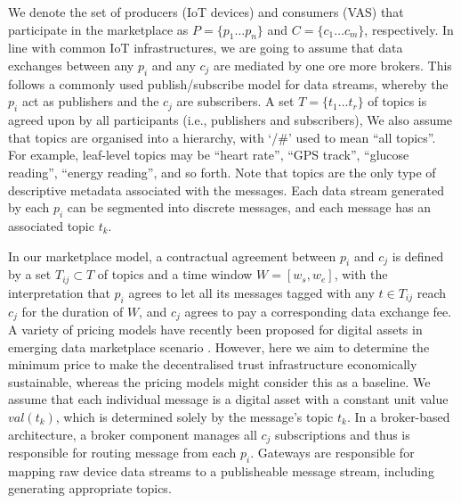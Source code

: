 \documentclass[chi_draft]{sigchi}
\begin{document}
We denote the set of producers (IoT devices) and consumers (VAS) that participate in the marketplace as $P = \{p_1 \dots p_n \}$ and $C = \{ c_1 \dots c_m \}$, respectively.
In line with common %
IoT infrastructures, we are going to assume that data exchanges between any $p_i$ and any $c_j$ are mediated by one ore more brokers. 
This follows a commonly used publish/subscribe model for data streams, whereby the $p_i$ act as publishers and the $c_j$ are subscribers.
A set $T = \{ t_1 \dots t_r \}$ of topics is agreed upon by all participants (i.e., publishers and subscribers), 
%
We also assume %
that topics are organised into a hierarchy, with `/\#' used to mean ``all topics''. 
For example, leaf-level topics may be ``heart rate'', ``GPS track'', ``glucose reading'', ``energy reading'', and so forth. Note that topics are the only type of descriptive metadata associated with the messages. 
%
Each data stream generated by each $p_i$ can be segmented into discrete messages, and each message has an associated topic $t_k$.

In our marketplace model, a contractual agreement between $p_i$ and $c_j$ is defined by a set $T_{ij} \subset T$ of topics and a time window $ W = [w_s, w_e] $, with the interpretation that $p_i$ agrees to let all its messages tagged with any $t \in T_{ij}$ reach $c_j$ for the duration of $W$, and $c_j$ agrees to pay a corresponding data exchange fee. 
A variety of pricing models have recently been proposed for digital assets in emerging data marketplace scenario . However, here we aim to determine the minimum price to make the decentralised trust infrastructure economically sustainable, whereas the pricing models might consider this as a baseline. We assume that each individual message is a digital asset with a constant unit value $\mathit{val}(t_k)$, which is determined solely by the message's topic $t_k$. In a broker-based architecture, a broker component manages all $c_j$ subscriptions and thus is responsible for routing message from each $p_i$. Gateways are responsible for mapping raw device data streams to a publisheable message stream, including generating appropriate topics.
%
\end{document}
